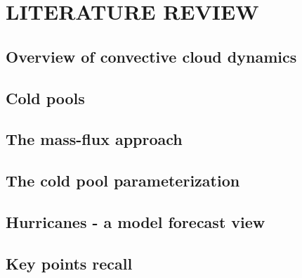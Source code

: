 
\chapter{LITERATURE REVIEW}
\label{ch:convection}




\section{Overview of convective cloud dynamics}

\section{Cold pools}

\section{The mass-flux approach}

\section{The cold pool parameterization}

\section{Hurricanes - a model forecast view}

\section{Key points recall}





